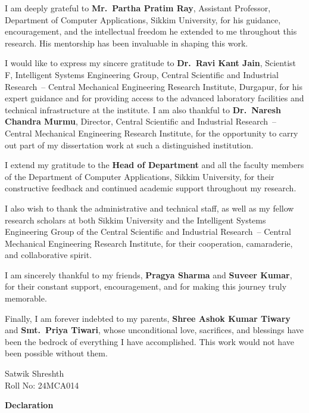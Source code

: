 \documentclass[12pt,a4paper,oneside]{report}
\newcommand{\fmchapter}[1]{%
  \clearpage\phantomsection
  \begin{center}{\LARGE\bfseries #1}\end{center}
  \vspace{0.5cm}
  \addcontentsline{toc}{chapter}{#1}%
}
\begin{document}
{
\noindent
I am deeply grateful to \textbf{Mr.\ Partha Pratim Ray}, Assistant Professor,
Department of Computer Applications, Sikkim University, for his guidance,
encouragement, and the intellectual freedom he extended to me throughout this
research. His mentorship has been invaluable in shaping this work.

\vspace{0.45cm}
\noindent
I would like to express my sincere gratitude to \textbf{Dr.\ Ravi Kant Jain},
Scientist F, Intelligent Systems Engineering Group, Central Scientific and Industrial Research~-- Central Mechanical
Engineering Research Institute, Durgapur, for his expert guidance and for
providing access to the advanced laboratory facilities and technical infrastructure
at the institute. I am also thankful to \textbf{Dr.\ Naresh Chandra Murmu},
Director, Central Scientific and Industrial Research~-- Central Mechanical Engineering Research Institute, for the opportunity to carry out part of my dissertation
work at such a distinguished institution.

\vspace{0.45cm}
\noindent
I extend my gratitude to the \textbf{Head of Department} and all the faculty
members of the Department of Computer Applications, Sikkim University, for their
constructive feedback and continued academic support throughout my research.

\vspace{0.45cm}
\noindent
I also wish to thank the administrative and technical staff, as well as my fellow
research scholars at both Sikkim University and the Intelligent Systems Engineering Group of the Central Scientific and Industrial Research~-- Central Mechanical Engineering Research Institute, for their
cooperation, camaraderie, and collaborative spirit.

\vspace{0.45cm}
\noindent
I am sincerely thankful to my friends, \textbf{Pragya Sharma} and
\textbf{Suveer Kumar}, for their constant support, encouragement, and for making
this journey truly memorable.

\vspace{0.45cm}
\noindent
Finally, I am forever indebted to my parents, \textbf{Shree Ashok Kumar Tiwary}
and \textbf{Smt.\ Priya Tiwari}, whose unconditional love, sacrifices, and
blessings have been the bedrock of everything I have accomplished. This work would
not have been possible without them.

\vspace{1.8cm}
\begin{flushright}
Satwik Shreshth\\
Roll No: 24MCA014
\end{flushright}
}
\newpage
\thispagestyle{plain}
\fmchapter{Declaration}
\end{document}

